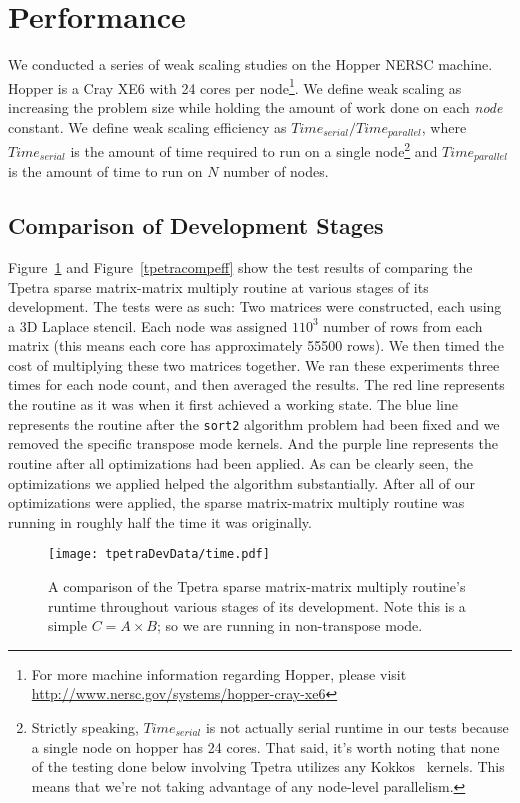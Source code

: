 \documentclass[pdf,12pt]{SANDreport}
\begin{document}
\section{Performance}
\label{perfSect}
We conducted a series of weak scaling studies on the Hopper NERSC machine. Hopper is a Cray XE6 with 24 cores
per node\footnote{For more machine information regarding Hopper, please visit 
\url{http://www.nersc.gov/systems/hopper-cray-xe6}}. We define weak scaling as increasing the problem size while holding 
the amount of work done on each \emph{node} constant. We define weak scaling efficiency as $Time_{serial}/Time_{parallel}$,
where $Time_{serial}$ is the amount of time required to run on a single node\footnote{Strictly speaking, $Time_{serial}$
is not actually serial runtime in our tests because a single node on hopper has 24 cores. That said, it's worth 
noting that none of the testing done below involving Tpetra utilizes any Kokkos~\cite{KokkosHomePage} kernels.  
This means that we're not taking advantage of any node-level parallelism.} and $Time_{parallel}$ is the amount of time to run
on $N$ number of nodes.

\subsection{Comparison of Development Stages}
Figure~\ref{tpetracomptime} and Figure~\ref{tpetracompeff} show the test results of comparing the Tpetra sparse 
matrix-matrix multiply routine at various stages of its 
development. The tests were as such: Two matrices were constructed, each using a 3D Laplace stencil. Each node was assigned 
$110^3$ number of rows from each matrix (this means each core has approximately 55500 rows). 
We then timed the cost of multiplying these two matrices together. We ran these experiments three times for each node 
count, and then averaged the results. The red line represents the routine as it was when it first achieved a working state. 
The blue line represents the routine after the \verb!sort2! algorithm problem had been fixed and we removed the specific 
transpose mode kernels. And the purple line represents the routine after all optimizations had been applied.
As can be clearly seen, the optimizations we applied helped the algorithm substantially. After all of our optimizations 
were applied, the sparse matrix-matrix multiply routine was running in roughly half the time it was originally.

\begin{figure}
\centering
\texttt{[image: tpetraDevData/time.pdf]}
\caption[Tpetra Development Time Comparison]{A comparison of the Tpetra sparse matrix-matrix multiply routine's runtime 
throughout various stages of its development. Note this is a simple $C=A \times B$; so we are running in non-transpose mode.}
\label{tpetracomptime}
\end{figure}
\end{document}
